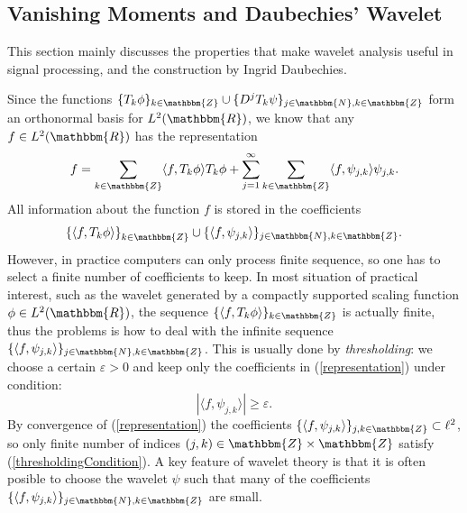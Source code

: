 \documentclass{book}
\newcommand{\tmtextit}[1]{{\itshape{#1}}}
\begin{document}
\subsection{Vanishing Moments and Daubechies' Wavelet}

This section mainly discusses the properties that make wavelet analysis useful
in signal processing, and the construction by Ingrid Daubechies.

Since the functions $\{ T_k \phi \}_{k \in \mathbbm{Z}} \cup \{ D^j T_k \psi
\}_{j \in \mathbbm{N}, k \in \mathbbm{Z}}$ form an orthonormal basis for $L^2
(\mathbbm{R})$, we know that any $f \in L^2 (\mathbbm{R})$ has the
representation
\begin{equation}
  f = \sum_{k \in \mathbbm{Z}} \langle f, T_k \phi \rangle T_k \phi + \sum_{j
  = 1}^{\infty} \sum_{k \in \mathbbm{Z}} \langle f, \psi_{j, k} \rangle
  \psi_{j, k} . \label{representation}
\end{equation}
All information about the function $f$ is stored in the coefficients
\[ \{ \langle f, T_k \phi \rangle \}_{k \in \mathbbm{Z}}^{} \cup \{ \langle f,
   \psi_{j, k} \rangle \}_{j \in \mathbbm{N}, k \in \mathbbm{Z}} . \]
However, in practice computers can only process finite sequence, so one has to
select a finite number of coefficients to keep. In most situation of practical
interest, such as the wavelet generated by a compactly supported scaling
function $\phi \in L^2 (\mathbbm{R})$, the sequence $\{ \langle f, T_k \phi
\rangle \}_{k \in \mathbbm{Z}}$ is actually finite, thus the problems is how
to deal with the infinite sequence $\{ \langle f, \psi_{j, k} \rangle \}_{j
\in \mathbbm{N}, k \in \mathbbm{Z}}$. This is usually done by
\tmtextit{thresholding}{\cite{schneider2010wavelet}}: we choose a certain
$\varepsilon > 0$ and keep only the coefficients in (\ref{representation})
under condition:
\begin{equation}
  | \langle f, \psi_{j, k} \rangle | \geqslant \varepsilon .
  \label{thresholdingCondition}
\end{equation}
By convergence of (\ref{representation}) the coefficients $\{ \langle f,
\psi_{j, k} \rangle \}_{j, k \in \mathbbm{Z}} \subset \ell^2$, so only finite
number of indices $(j, k) \in \mathbbm{Z} \times \mathbbm{Z}$ satisfy
(\ref{thresholdingCondition}). A key feature of wavelet theory is that it is
often posible to choose the wavelet $\psi$ such that many of the coefficients
$\{ \langle f, \psi_{j, k} \rangle \}_{j \in \mathbbm{N}, k \in \mathbbm{Z}}$
are small.
\end{document}
